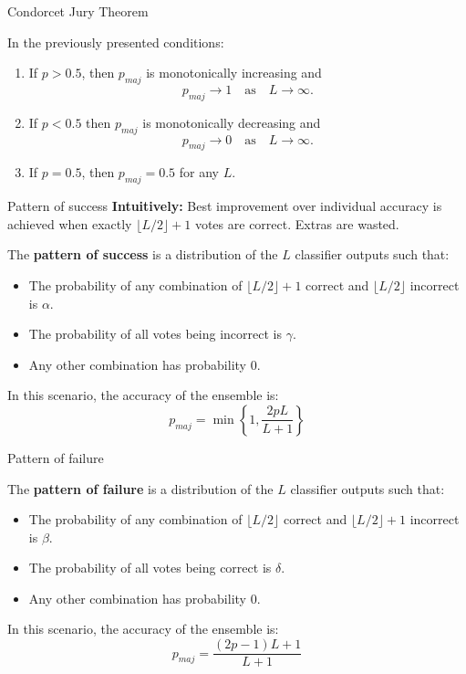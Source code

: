 \documentclass[xcolor=table]{beamer}
\begin{document}
\begin{frame}{Condorcet Jury Theorem}
\begin{theorem}
    In the previously presented conditions:
    \begin{enumerate}
        \item If \(p > 0.5\), then \(p_{maj}\) is monotonically increasing and 
        \[
        p_{maj}\to 1 \quad \text{as} \quad L \to \infty.
        \]
        \item If \(p < 0.5\) then \(p_{maj}\) is monotonically decreasing and
        \[
        p_{maj}\to 0 \quad \text{as} \quad L \to \infty.
        \]
        \item If \(p = 0.5\), then \(p_{maj} = 0.5\) for any \(L\).
    \end{enumerate}
\end{theorem}
    
\end{frame}

\begin{frame}{Pattern of success}
    \textbf{Intuitively:} Best improvement over individual accuracy is achieved when exactly \(\lfloor L/2\rfloor + 1\) votes are correct. Extras are wasted.

\pause
    \begin{definition}
        The \textbf{pattern of success} is a distribution of the \(L\) classifier outputs such that:
        \begin{itemize}
            \item The probability of any combination of \(\lfloor L/2\rfloor + 1\) correct and \(\lfloor L/2\rfloor\) incorrect is \(\alpha\).
            \item The probability of all votes being incorrect is \(\gamma\).
            \item Any other combination has probability \(0\).
        \end{itemize}
    \end{definition}
    \pause
    In this scenario, the accuracy of the ensemble is:
    \[
    p_{maj} = \min \left\{1, \frac{2pL}{L+1}\right\}
    \]
\end{frame}


\begin{frame}{Pattern of failure}
    \begin{definition}
        The \textbf{pattern of failure} is a distribution of the \(L\) classifier outputs such that:
        \begin{itemize}
            \item The probability of any combination of \(\lfloor L/2\rfloor\) correct and \(\lfloor L/2\rfloor + 1\) incorrect is \(\beta\).
            \item The probability of all votes being correct is \(\delta\).
            \item Any other combination has probability \(0\).
        \end{itemize}
    \end{definition}
    \pause
    In this scenario, the accuracy of the ensemble is:
    \[
    p_{maj} = \frac{(2p-1)L + 1}{L+1}
    \]
\end{frame}
\end{document}
